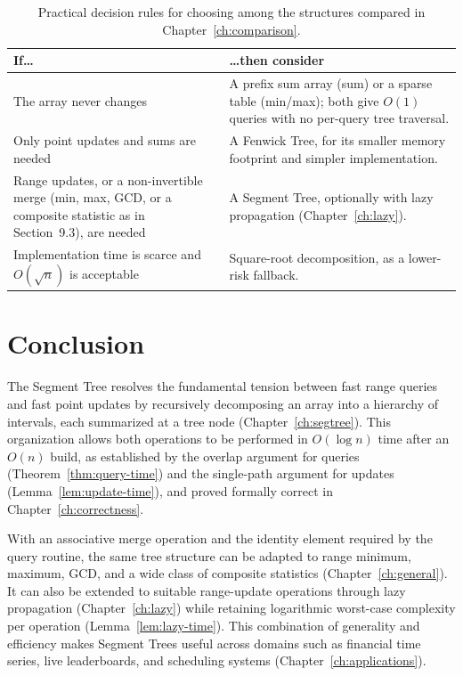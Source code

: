 \documentclass[
  11pt,
  a4paper,
  twoside=false,
  numbers=noenddot,
  headings=big,
  parskip=half,
  toc=bibliography,
  toc=listof,
  bibliography=totoc
]{scrreprt}
\newcommand{\Oh}[1]{O\!\left(#1\right)}
\newcommand{\tblhead}[1]{\textbf{\sffamily #1}}
\begin{document}
\begin{table}[H]
\centering
\caption{Practical decision rules for choosing among the structures compared in Chapter~\ref{ch:comparison}.}
\label{tab:decision-rules}
\begin{tabular}{>{\raggedright\arraybackslash}p{4.6cm}p{7.6cm}}
\toprule
\tblhead{If\ldots} & \tblhead{\ldots then consider} \\
\midrule
The array never changes & A prefix sum array (sum) or a sparse table (min/max); both give $\Oh{1}$ queries with no per-query tree traversal. \\
Only point updates and sums are needed & A Fenwick Tree, for its smaller memory footprint and simpler implementation. \\
Range updates, or a non-invertible merge (min, max, GCD, or a composite statistic as in Section~9.3), are needed & A Segment Tree, optionally with lazy propagation (Chapter~\ref{ch:lazy}). \\
Implementation time is scarce and $\Oh{\sqrt n}$ is acceptable & Square-root decomposition, as a lower-risk fallback. \\
\bottomrule
\end{tabular}
\end{table}

\chapter{Conclusion}
\label{ch:conclusion}

The Segment Tree resolves the fundamental tension between fast range queries and fast point updates by recursively decomposing an array into a hierarchy of intervals, each summarized at a tree node (Chapter~\ref{ch:segtree}). This organization allows both operations to be performed in $\Oh{\log n}$ time after an $\Oh{n}$ build, as established by the overlap argument for queries (Theorem~\ref{thm:query-time}) and the single-path argument for updates (Lemma~\ref{lem:update-time}), and proved formally correct in Chapter~\ref{ch:correctness}.

With an associative merge operation and the identity element required by the query routine, the same tree structure can be adapted to range minimum, maximum, GCD, and a wide class of composite statistics (Chapter~\ref{ch:general}). It can also be extended to suitable range-update operations through lazy propagation (Chapter~\ref{ch:lazy}) while retaining logarithmic worst-case complexity per operation (Lemma~\ref{lem:lazy-time}). This combination of generality and efficiency makes Segment Trees useful across domains such as financial time series, live leaderboards, and scheduling systems (Chapter~\ref{ch:applications}).
\end{document}
